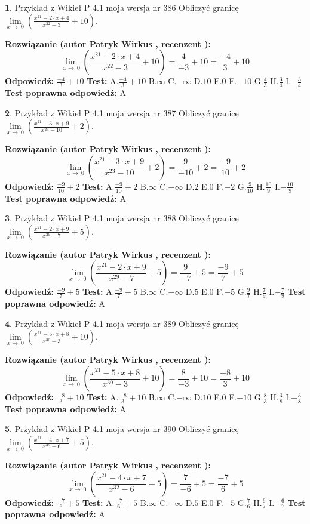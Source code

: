 \documentclass[12pt, a4paper]{article}
\theoremstyle{definition} %
\newtheorem{zad}{}
\newcommand{\zadStart}[1]{\begin{zad}#1\newline}
\newcommand{\zadStop}{\end{zad}}
\newcommand{\rozwStart}[2]{\noindent \textbf{Rozwiązanie (autor #1 , recenzent #2): }\newline}
\newcommand{\rozwStop}{\newline}
\newcommand{\odpStart}{\noindent \textbf{Odpowiedź:}\newline}
\newcommand{\odpStop}{\newline}
\newcommand{\testStart}{\noindent \textbf{Test:}\newline}
\newcommand{\testStop}{\newline}
\newcommand{\kluczStart}{\noindent \textbf{Test poprawna odpowiedź:}\newline}
\newcommand{\kluczStop}{\newline}
\begin{document}
\zadStart{Przykład z Wikieł P 4.1 moja wersja nr 386}
Obliczyć granicę $\lim\limits_{x\to\ 0}(\frac{x^{21}-2 \cdot x +4}{x^{22}-3}+10)$.
\zadStop
\rozwStart{Patryk Wirkus}{}
$$\lim\limits_{x\to\ 0}(\frac{x^{21}-2 \cdot x +4}{x^{22}-3}+10)=\frac{4}{-3}+10=\frac{-4}{3}+10$$
\rozwStop
\odpStart
$\frac{-4}{3}+10$
\odpStop
\testStart
A.$\frac{-4}{3}+10$
B.$\infty$
C.$-\infty$
D.$10$
E.$0$
F.$-10$
G.$\frac{4}{3}$
H.$\frac{3}{4}$
I.$-\frac{3}{4}$
\testStop
\kluczStart
A
\kluczStop



\zadStart{Przykład z Wikieł P 4.1 moja wersja nr 387}
Obliczyć granicę $\lim\limits_{x\to\ 0}(\frac{x^{21}-3 \cdot x +9}{x^{23}-10}+2)$.
\zadStop
\rozwStart{Patryk Wirkus}{}
$$\lim\limits_{x\to\ 0}(\frac{x^{21}-3 \cdot x +9}{x^{23}-10}+2)=\frac{9}{-10}+2=\frac{-9}{10}+2$$
\rozwStop
\odpStart
$\frac{-9}{10}+2$
\odpStop
\testStart
A.$\frac{-9}{10}+2$
B.$\infty$
C.$-\infty$
D.$2$
E.$0$
F.$-2$
G.$\frac{9}{10}$
H.$\frac{10}{9}$
I.$-\frac{10}{9}$
\testStop
\kluczStart
A
\kluczStop



\zadStart{Przykład z Wikieł P 4.1 moja wersja nr 388}
Obliczyć granicę $\lim\limits_{x\to\ 0}(\frac{x^{21}-2 \cdot x +9}{x^{29}-7}+5)$.
\zadStop
\rozwStart{Patryk Wirkus}{}
$$\lim\limits_{x\to\ 0}(\frac{x^{21}-2 \cdot x +9}{x^{29}-7}+5)=\frac{9}{-7}+5=\frac{-9}{7}+5$$
\rozwStop
\odpStart
$\frac{-9}{7}+5$
\odpStop
\testStart
A.$\frac{-9}{7}+5$
B.$\infty$
C.$-\infty$
D.$5$
E.$0$
F.$-5$
G.$\frac{9}{7}$
H.$\frac{7}{9}$
I.$-\frac{7}{9}$
\testStop
\kluczStart
A
\kluczStop



\zadStart{Przykład z Wikieł P 4.1 moja wersja nr 389}
Obliczyć granicę $\lim\limits_{x\to\ 0}(\frac{x^{21}-5 \cdot x +8}{x^{30}-3}+10)$.
\zadStop
\rozwStart{Patryk Wirkus}{}
$$\lim\limits_{x\to\ 0}(\frac{x^{21}-5 \cdot x +8}{x^{30}-3}+10)=\frac{8}{-3}+10=\frac{-8}{3}+10$$
\rozwStop
\odpStart
$\frac{-8}{3}+10$
\odpStop
\testStart
A.$\frac{-8}{3}+10$
B.$\infty$
C.$-\infty$
D.$10$
E.$0$
F.$-10$
G.$\frac{8}{3}$
H.$\frac{3}{8}$
I.$-\frac{3}{8}$
\testStop
\kluczStart
A
\kluczStop



\zadStart{Przykład z Wikieł P 4.1 moja wersja nr 390}
Obliczyć granicę $\lim\limits_{x\to\ 0}(\frac{x^{21}-4 \cdot x +7}{x^{32}-6}+5)$.
\zadStop
\rozwStart{Patryk Wirkus}{}
$$\lim\limits_{x\to\ 0}(\frac{x^{21}-4 \cdot x +7}{x^{32}-6}+5)=\frac{7}{-6}+5=\frac{-7}{6}+5$$
\rozwStop
\odpStart
$\frac{-7}{6}+5$
\odpStop
\testStart
A.$\frac{-7}{6}+5$
B.$\infty$
C.$-\infty$
D.$5$
E.$0$
F.$-5$
G.$\frac{7}{6}$
H.$\frac{6}{7}$
I.$-\frac{6}{7}$
\testStop
\kluczStart
A
\kluczStop
\end{document}
